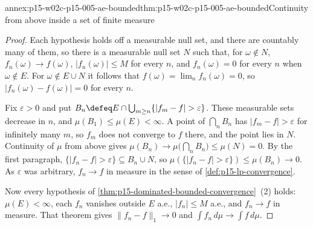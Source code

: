 \begin{annexitem}{annex:p15-w02c-p15-005-ae-bounded}{thm:p15-w02c-p15-005-ae-bounded}{Continuity from above inside a set of finite measure}
\begin{proof}
Each hypothesis holds off a measurable null set, and there are
countably many of them, so there is a measurable null set \(N\) such
that, for \(\omega\notin N\), \(f_n(\omega)\to f(\omega)\),
\(|f_n(\omega)|\leq M\) for every \(n\), and \(f_n(\omega)=0\) for
every \(n\) when \(\omega\notin E\). For \(\omega\notin E\cup N\) it
follows that \(f(\omega)=\lim_nf_n(\omega)=0\), so
\(|f_n(\omega)-f(\omega)|=0\) for every \(n\).

Fix \(\varepsilon>0\) and put
\(B_n\defeq E\cap\bigcup_{m\geq n}\{|f_m-f|>\varepsilon\}\). These
measurable sets decrease in \(n\), and \(\mu(B_1)\leq\mu(E)<\infty\).
A point of \(\bigcap_nB_n\) has \(|f_m-f|>\varepsilon\) for infinitely
many \(m\), so \(f_m\) does not converge to \(f\) there, and the point
lies in \(N\). Continuity of \(\mu\) from above gives
\(\mu(B_n)\to\mu\bigl(\bigcap_nB_n\bigr)\leq\mu(N)=0\). By the first
paragraph,
\(\{|f_n-f|>\varepsilon\}\subseteq B_n\cup N\), so
\(\mu(\{|f_n-f|>\varepsilon\})\leq\mu(B_n)\to0\). As \(\varepsilon\)
was arbitrary, \(f_n\to f\) in measure in the sense of
\cref{def:p15-lp-convergence}.

Now every hypothesis of \cref{thm:p15-dominated-bounded-convergence}~(2)
holds: \(\mu(E)<\infty\), each \(f_n\) vanishes outside \(E\) a.e.,
\(|f_n|\leq M\) a.e., and \(f_n\to f\) in measure. That theorem gives
\(\|f_n-f\|_1\to0\) and \(\int f_n\,d\mu\to\int f\,d\mu\).
\end{proof}
\end{annexitem}

